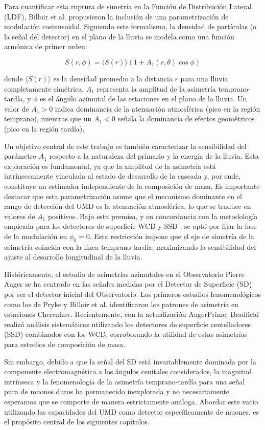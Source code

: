Para cuantificar esta ruptura de simetría en la Función de Distribución Lateral (LDF), Billoir et al. \cite{Billoir2002} propusieron la inclusión de una parametrización de modulación cosinusoidal. Siguiendo este formalismo, la densidad de partículas (o la señal del detector) en el plano de la lluvia se modela como una función armónica de primer orden:

\begin{equation}
	S(r,\phi) = \langle S(r) \rangle \left( 1 + A_1(r, \theta) \cos\phi \right)
	\label{eq:asimetria_a1}
\end{equation}

donde $\langle S(r) \rangle$ es la densidad promedio a la distancia $r$ para una lluvia completamente simétrica, $A_1$ representa la amplitud de la asimetría temprano-tardía, y $\phi$ es el ángulo azimutal de las estaciones en el plano de la lluvia. Un valor de $A_1 > 0$ indica dominancia de la atenuación atmosférica (pico en la región temprano), mientras que un $A_1 < 0$ señala la dominancia de efectos geométricos (pico en la región tardía).

Un objetivo central de este trabajo es también caracterizar la sensibilidad del parámetro $A_1$ respecto a la naturaleza del primario y la energía de la lluvia. Esta exploración es fundamental, ya que la amplitud de la asimetría está intrínsecamente vinculada al estado de desarrollo de la cascada y, por ende, constituye un estimador independiente de la composición de masa. Es importante destacar que esta parametrización asume que el mecanismo dominante en el rango de detección del UMD es la atenuación atmosférica, lo que se traduce en valores de $A_1$ positivos. Bajo esta premisa, y en concordancia con la metodología empleada para los detectores de superficie WCD y SSD \cite{BradfieldThesis}, se optó por fijar la fase de la modulación en $\phi_0 = 0$. Esta restricción impone que el eje de simetría de la asimetría coincida con la línea temprano-tardía, maximizando la sensibilidad del ajuste al desarrollo longitudinal de la lluvia.

Históricamente, el estudio de asimetrías azimutales en el Observatorio Pierre Auger se ha centrado en las señales medidas por el Detector de Superficie (SD) por ser el detector inicial del Observatorio. Los primeros estudios fenomenológicos como los de Pryke \cite{Pryke1998} y Billoir et al. \cite{Billoir2002} identificaron los patrones de asimetría en estaciones Cherenkov. Recientemente, con la actualización AugerPrime, Bradfield \cite{BradfieldThesis} realizó análisis sistemáticos utilizando los detectores de superficie centelladores (SSD) combinados con los WCD, corroborando la utilidad de estas asimetrías para estudios de composición de masa.

Sin embargo, debido a que la señal del SD está invariablemente dominada por la componente electromagnética a los ángulos cenitales considerados, la magnitud intrínseca y la fenomenología de la asimetría temprano-tardía para una señal pura de muones duros ha permanecido inexplorada y no necesariamente esperamos que se comporte de manera estrictamente análoga. Abordar este vacío utilizando las capacidades del UMD como detector específicamente de muones, es el propósito central de los siguientes capítulos.

\newpage
